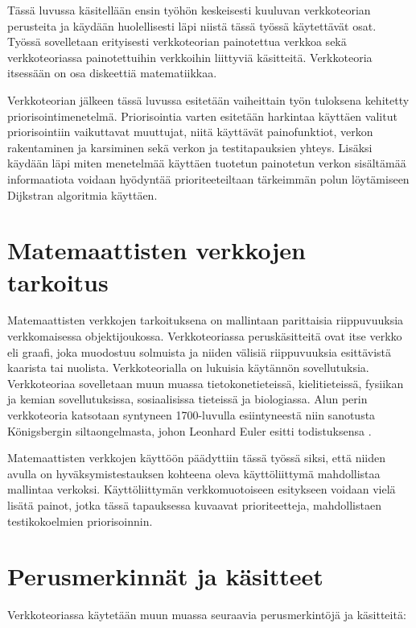 Tässä luvussa käsitellään ensin työhön keskeisesti kuuluvan verkkoteorian perusteita ja käydään huolellisesti läpi niistä tässä työssä käytettävät osat.
Työssä sovelletaan erityisesti verkkoteorian painotettua verkkoa sekä verkkoteoriassa painotettuihin verkkoihin liittyviä käsitteitä.
Verkkoteoria itsessään on osa diskeettiä matematiikkaa.

Verkkoteorian jälkeen tässä luvussa esitetään vaiheittain työn tuloksena kehitetty priorisointimenetelmä.
Priorisointia varten esitetään harkintaa käyttäen valitut priorisointiin vaikuttavat muuttujat, niitä käyttävät painofunktiot, verkon rakentaminen ja karsiminen sekä verkon ja testitapauksien yhteys.
Lisäksi käydään läpi miten menetelmää käyttäen tuotetun painotetun verkon sisältämää informaatiota voidaan hyödyntää prioriteeteiltaan tärkeimmän polun löytämiseen Dijkstran algoritmia käyttäen.

\section{Matemaattisten verkkojen tarkoitus} \label{ch:09_matemaattisten_verkkojen_tarkoitus}

  Matemaattisten verkkojen tarkoituksena on mallintaan parittaisia riippuvuuksia verkkomaisessa objektijoukossa.
  Verkkoteoriassa peruskäsitteitä ovat itse verkko eli graafi, joka muodostuu solmuista ja niiden välisiä riippuvuuksia esittävistä kaarista tai nuolista.
  Verkkoteorialla on lukuisia käytännön sovellutuksia. Verkkoteoriaa sovelletaan muun muassa tietokonetieteissä, kielitieteissä, fysiikan ja kemian sovellutuksissa, sosiaalisissa tieteissä ja biologiassa.
  Alun perin verkkoteoria katsotaan syntyneen 1700-luvulla esiintyneestä niin sanotusta Königsbergin siltaongelmasta, johon Leonhard Euler esitti todistuksensa \parencite{graph_theory_history}.

  Matemaattisten verkkojen käyttöön päädyttiin tässä työssä siksi, että niiden avulla on hyväksymistestauksen kohteena oleva käyttöliittymä mahdollistaa mallintaa verkoksi.
  Käyttöliittymän verkkomuotoiseen esitykseen voidaan vielä lisätä painot, jotka tässä tapauksessa kuvaavat prioriteetteja, mahdollistaen testikokoelmien priorisoinnin.

\section{Perusmerkinnät ja käsitteet} \label{ch:09_perusmerkinnat_ja_kasitteet}

  Verkkoteoriassa käytetään muun muassa seuraavia perusmerkintöjä ja käsitteitä:

